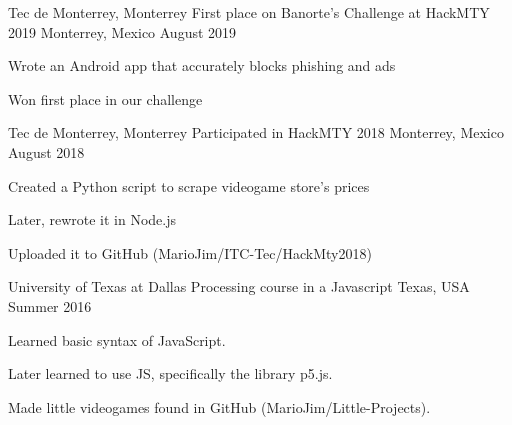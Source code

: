 

\begin{cventries}

  \cventry
    {Tec de Monterrey, Monterrey} %
    {First place on Banorte's Challenge at HackMTY 2019} %
    {Monterrey, Mexico} %
    {August 2019} %
    {
      \begin{cvitems} %
        \item {Wrote an Android app that accurately blocks phishing and ads}
        \item {Won first place in our challenge}
      \end{cvitems}
    }

  \cventry
    {Tec de Monterrey, Monterrey} %
    {Participated in HackMTY 2018} %
    {Monterrey, Mexico} %
    {August 2018} %
    {
      \begin{cvitems} %
        \item {Created a Python script to scrape videogame store's prices}
        \item {Later, rewrote it in Node.js}
        \item {Uploaded it to GitHub (MarioJim/ITC-Tec/HackMty2018)}
      \end{cvitems}
    }

  \cventry
    {University of Texas at Dallas} %
    {Processing course in a Javascript} %
    {Texas, USA} %
    {Summer 2016} %
    {
      \begin{cvitems} %
        \item {Learned basic syntax of JavaScript.}
        \item {Later learned to use JS, specifically the library p5.js.}
        \item {Made little videogames found in GitHub (MarioJim/Little-Projects).}
      \end{cvitems}
    }

\end{cventries}
